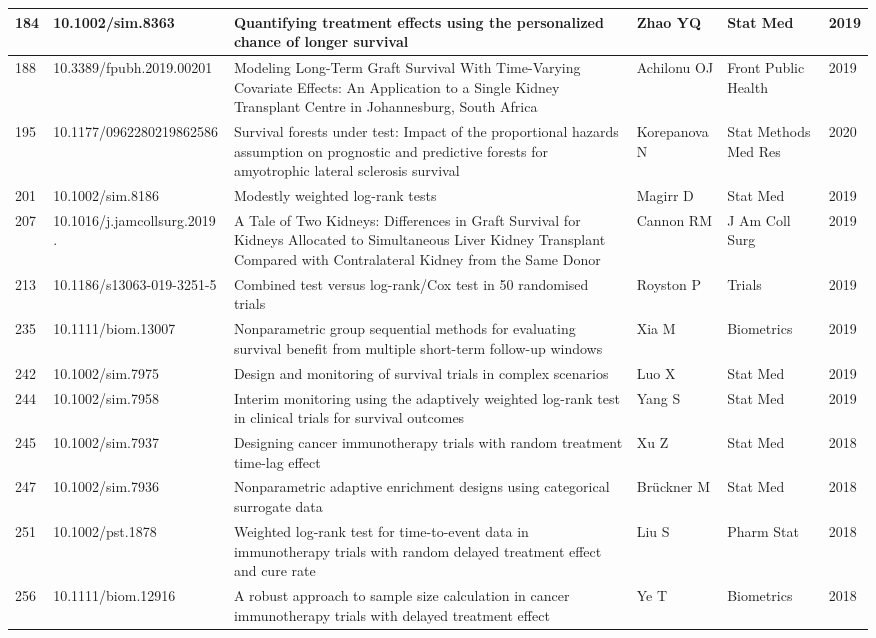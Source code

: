 \begin{landscape}
\begin{longtable}{|p{0.3in}|p{1.8in}|p{2.4in}|p{0.68in}|p{0.89in}|p{0.3in}|}
184 & 10.1002/sim.8363      & Quantifying treatment effects using the personalized chance of longer survival & Zhao YQ & Stat Med & 2019 \\ \hline 
188 & 10.3389/fpubh.2019.00201      & Modeling Long-Term Graft Survival With Time-Varying Covariate Effects: An Application to a Single Kidney Transplant Centre in Johannesburg, South Africa & Achilonu OJ & Front Public Health & 2019 \\ \hline 
195 & 10.1177/0962280219862586      & Survival forests under test: Impact of the proportional hazards assumption on prognostic and predictive forests for amyotrophic lateral sclerosis survival & Korepanova N & Stat Methods Med Res & 2020 \\ \hline 
201 & 10.1002/sim.8186      & Modestly weighted log-rank tests & Magirr D & Stat Med & 2019 \\ \hline 
207 & 10.1016/j.jamcollsurg.2019     .\-04.019 & A Tale of Two Kidneys: Differences in Graft Survival for Kidneys Allocated to Simultaneous Liver Kidney Transplant Compared with Contralateral Kidney from the Same Donor & Cannon RM & J Am Coll Surg & 2019 \\ \hline 
213 & 10.1186/s13063-019-3251-5      & Combined test versus log-rank/Cox test in 50 randomised trials & Royston P & Trials & 2019 \\ \hline 
235 & 10.1111/biom.13007     & Nonparametric group sequential methods for evaluating survival benefit from multiple short-term follow-up windows & Xia M & Biometrics & 2019 \\ \hline 
242 & 10.1002/sim.7975     & Design and monitoring of survival trials in complex scenarios & Luo X & Stat Med & 2019 \\ \hline 
244 & 10.1002/sim.7958      & Interim monitoring using the adaptively weighted log-rank test in clinical trials for survival outcomes & Yang S & Stat Med & 2019 \\ \hline 
245 & 10.1002/sim.7937      & Designing cancer immunotherapy trials with random treatment time-lag effect & Xu Z & Stat Med & 2018 \\ \hline 
247 & 10.1002/sim.7936     & Nonparametric adaptive enrichment designs using categorical surrogate data & Br\"{u}ckner M & Stat Med & 2018 \\ \hline 
251 & 10.1002/pst.1878    & Weighted log-rank test for time-to-event data in immunotherapy trials with random delayed treatment effect and cure rate & Liu S & Pharm Stat & 2018 \\ \hline 
256 & 10.1111/biom.12916   & A robust approach to sample size calculation in cancer immunotherapy trials with delayed treatment effect & Ye T & Biometrics & 2018 \\ \hline 

\end{longtable}
\end{landscape}
